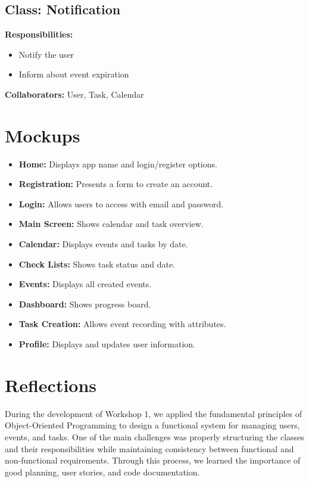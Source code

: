 \documentclass[man]{apa7}
\begin{document}
\subsection*{Class: Notification}
\textbf{Responsibilities:}
\begin{itemize}
\item Notify the user
\item Inform about event expiration
\end{itemize}
\textbf{Collaborators:} User, Task, Calendar


\section{Mockups}
\begin{itemize}
\item \textbf{Home:} Displays app name and login/register options.
\item \textbf{Registration:} Presents a form to create an account.
\item \textbf{Login:} Allows users to access with email and password.
\item \textbf{Main Screen:} Shows calendar and task overview.
\item \textbf{Calendar:} Displays events and tasks by date.
\item \textbf{Check Lists:} Shows task status and date.
\item \textbf{Events:} Displays all created events.
\item \textbf{Dashboard:} Shows progress board.
\item \textbf{Task Creation:} Allows event recording with attributes.
\item \textbf{Profile:} Displays and updates user information.
\end{itemize}

\section{Reflections}
During the development of Workshop 1, we applied the fundamental principles of Object-Oriented Programming to design a functional system for managing users, events, and tasks. One of the main challenges was properly structuring the classes and their responsibilities while maintaining consistency between functional and non-functional requirements. Through this process, we learned the importance of good planning, user stories, and code documentation.
\end{document}
